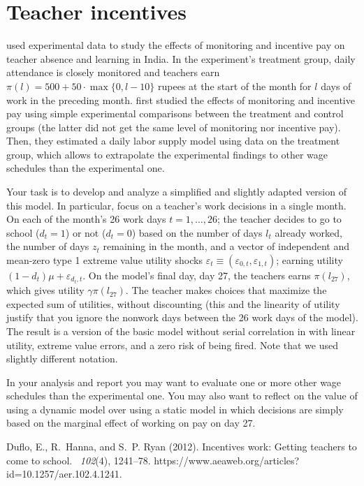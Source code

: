 \documentclass[fleqn,12pt]{article}
\renewenvironment{thebibliography}[1]{\begin{oldthebibliography}{#1}\setlength{\itemsep}{4.2pt}}{\end{oldthebibliography}}
\theoremstyle{plain}
\theoremstyle{definition}
\begin{document}
\section*{Teacher incentives}

\citet{aer12:dufloetal} used experimental data to study the effects of monitoring and incentive pay on teacher absence and learning in India. In the experiment's treatment group, daily attendance is closely monitored and teachers earn $\pi(l)=500+50\cdot\max\{0,l-10\}$ rupees at the start of the month for $l$ days of work in the preceding month. \citeauthor{aer12:dufloetal} first studied the effects of monitoring and incentive pay using simple experimental comparisons between the treatment and control groups (the latter did not get the same level of monitoring nor incentive pay). Then, they estimated a daily labor supply model using data on the treatment group, which allows to extrapolate the experimental findings to other wage schedules than the experimental one. 

Your task is to develop and analyze a simplified and slightly adapted version of this model. In particular, focus on a teacher's work decisions in a single month. On each of the month's 26 work days $t=1,\ldots,26$; the teacher decides to go to school ($d_t=1$) or not ($d_t=0$) based on the number of days $l_t$ already worked, the number of days $z_t$ remaining in the month, and a vector of independent and mean-zero type 1 extreme value utility shocks $\varepsilon_t\equiv(\varepsilon_{0,t},\varepsilon_{1,t})$; earning utility $(1-d_t)\mu+\varepsilon_{d_t,t}$. On the model's final day, day 27, the teachers earns $\pi(l_{27})$, which gives utility $\gamma\pi(l_{27})$.  The teacher makes choices that maximize the expected sum of utilities, without discounting (this and the linearity of utility justify that you ignore the nonwork days between the 26 work days of the model). The result is a version of the basic model without serial correlation in \citet[][Section III]{aer12:dufloetal} with linear utility, extreme value errors, and a zero risk of being fired. Note that we used slightly different notation.

In your analysis and report you may want to evaluate one or more other wage schedules than the experimental one. You may also want to reflect on the value of using a dynamic model over  using a static model in which decisions are simply based on the marginal effect of working on pay on day 27. 

\begin{thebibliography}{}

Duflo, E., R.~Hanna, and S.~P. Ryan (2012).
\newblock Incentives work: Getting teachers to come to school.
~{\em 102\/}(4), 1241--78.
\newblock https://www.aeaweb.org/articles?id=10.1257/aer.102.4.1241.

\end{thebibliography}
\end{document}
